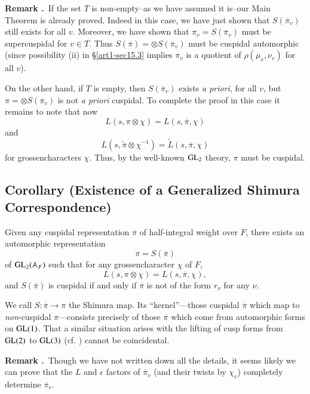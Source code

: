 \medskip
\noindent
{\bf Remark .\label{art1-rem15.5}}~If the set $T$ is non-empty--as we have assumed it is--our Main Theorem is already proved. Indeed in this case, we have just shown that $S(\overline{\pi}_{v})$ still exists for all $v$. Moreover, we have shown that $\pi_{v}=S(\overline{\pi}_{v})$ must be supercuspidal for $v\in T$. Thus $S(\overline{\pi})=\otimes S(\overline{\pi}_{v})$ must be cuspidal automorphic (since possibility (ii) in \S\ref{art1-sec15.3} implies $\pi_{v}$ is a quotient of $\rho(\mu_{v},\nu_{v})$ for all $v$).

On the other hand, if $T$ is empty, then $S(\overline{\pi}_{v})$ exists {\em a priori}, for all $v$, but $\pi=\otimes S(\overline{\pi}_{v})$ is not {\em a priori} cuspidal. To complete the proof in this case it remains to note that now
$$
L(s,\pi\otimes \chi)=L(s,\overline{\pi},\chi)
$$
and
$$
L(s,\widetilde{\pi}\otimes \chi^{-1})=\widetilde{L}(s,\overline{\pi},\chi)
$$
for grossencharacters $\chi$. Thus, by the well-known $\mathrm{GL}_{2}$ theory, $\pi$ must be cuspidal.

\setcounter{subsection}{5}
\subsection{Corollary (Existence of a Generalized Shimura Correspondence)}\label{art1-sec15.6}

Given any cuspidal representation $\overline{\pi}$ of half-integral weight over $F$, there exists an automorphic representation
$$
\pi=S(\overline{\pi})
$$
of $\mathrm{GL}_{2}(\mathbb{A}_{F})$ such that for any grossencharacter $\chi$ of $F$,
$$
L(s,\pi\otimes \chi)=L(s,\overline{\pi},\chi),
$$
and $S(\overline{\pi})$ is cuspidal if and only if $\overline{\pi}$ is not of the form $r_{\nu}$ for any $\nu$.

We call $S:\overline{\pi}\to \pi$ the Shimura map. Its ``kernel''---those cuspidal $\overline{\pi}$ which map to {\em non}-cuspidal $\pi$---consists precisely of those $\overline{\pi}$ which come from automorphic forms on $\mathrm{GL}(1)$. That a similar situation arises with the lifting of cusp forms from $\mathrm{GL}(2)$ to $\mathrm{GL}(3)$ (cf. \cite{GeJa}) cannot be coincidental.

\medskip
\noindent
{\bf Remark .\label{art1-rem15.7}}~Though we have not written down all the details, it seems likely we can prove that the $L$ and $\epsilon$ factors of $\overline{\pi}_{v}$ (and their twists by $\chi_{v}$) completely determine $\overline{\pi}_{v}$.

